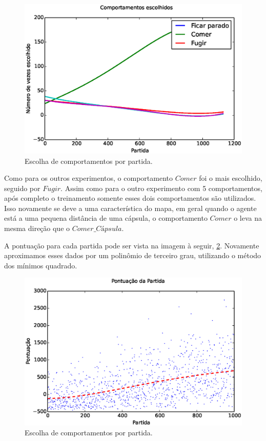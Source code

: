 \begin{figure}[H]
    \centering
    \includegraphics[width=\linewidth]{images/5_behaviors_original_map/chosen_behaviors_pol}
    \caption{Escolha de comportamentos por partida.}
    \label{img:5ComportamentosMapaOriginal:ComportamentosEscolhidosPolinômio}
\end{figure}

Como para os outros experimentos, o comportamento $ Comer $ foi o mais escolhido, seguido por $ Fugir $. Assim como para o outro experimento com 5 comportamentos, após completo o treinamento somente esses dois comportamentos são utilizados. Isso novamente se deve a uma característica do mapa, em geral quando o agente está a uma pequena distância de uma cápsula, o comportamento $ Comer $ o leva na mesma direção que o $ \textit{Comer\_Cápsula} $.

A pontuação para cada partida pode ser vista na imagem à seguir, \ref{img:5ComportamentosMapaOriginal:PontuacaoPorPartida}. Novamente aproximamos esses dados por um polinômio de terceiro grau, utilizando o método dos mínimos quadrado.

\begin{figure}[H]
    \centering
    \includegraphics[width=\linewidth]{images/5_behaviors_original_map/match_scores____pol}
    \caption{Escolha de comportamentos por partida.}
    \label{img:5ComportamentosMapaOriginal:PontuacaoPorPartida}
\end{figure}

